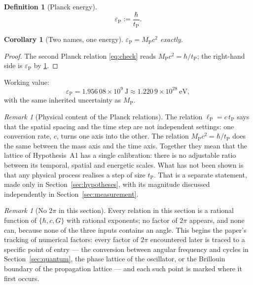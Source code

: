 \documentclass[11pt]{amsbook}
\theoremstyle{plain}
\newtheorem{corollary}[theorem]{Corollary}
\theoremstyle{definition}
\newtheorem{definition}[theorem]{Definition}
\theoremstyle{remark}
\newtheorem{remark}[theorem]{Remark}
\newcommand{\uses}[1]{\par\nopagebreak\noindent{\footnotesize\emph{Uses: #1.}\par}}
\begin{document}
\begin{definition}[Planck energy]\label{def:epsilon}
\begin{equation}\label{eq:epsilon}
\varepsilon_{\mathrm P} := \frac{\hbar}{t_{\mathrm P}}.
\end{equation}
\end{definition}

\begin{corollary}[Two names, one energy]\label{cor:epmp}
$\varepsilon_{\mathrm P} = M_{\mathrm P} c^{2}$ exactly.
\uses{\cref{def:epsilon,def:units}}
\end{corollary}

\begin{proof}
The second Planck relation \cref{eq:check} reads $M_{\mathrm P}c^{2} = \hbar/t_{\mathrm P}$; the right-hand side is $\varepsilon_{\mathrm P}$ by \cref{def:epsilon}.
\end{proof}

Working value:
\begin{equation}\label{eq:epsvalue}
\varepsilon_{\mathrm P} = 1.956\,08 \times 10^{9}\ \mathrm{J} \approx 1.220\,9 \times 10^{28}\ \mathrm{eV},
\end{equation}
with the same inherited uncertainty as $M_{\mathrm P}$.

\begin{remark}[Physical content of the Planck relations]\label{rem:reading}
The relation $\ell_{\mathrm P} = c\,t_{\mathrm P}$ says that the spatial spacing and the time step are not independent settings: one conversion rate, $c$, turns one axis into the other. The relation $M_{\mathrm P}c^{2} = \hbar/t_{\mathrm P}$ does the same between the mass axis and the time axis. Together they mean that the lattice of Hypothesis~A1 has a single calibration: there is no adjustable ratio between its temporal, spatial and energetic scales. What has not been shown is that any physical process realises a step of size $t_{\mathrm P}$. That is a separate statement, made only in Section~\ref{sec:hypotheses}, with its magnitude discussed independently in Section~\ref{sec:measurement}.
\end{remark}

\begin{remark}[No $2\pi$ in this section]\label{rem:twopi}
Every relation in this section is a rational function of $\{\hbar, c, G\}$ with rational exponents; no factor of $2\pi$ appears, and none can, because none of the three inputs contains an angle. This begins the paper's tracking of numerical factors: every factor of $2\pi$ encountered later is traced to a specific point of entry --- the conversion between angular frequency and cycles in Section~\ref{sec:quantum}, the phase lattice of the oscillator, or the Brillouin boundary of the propagation lattice --- and each such point is marked where it first occurs.
\end{remark}
\end{document}
